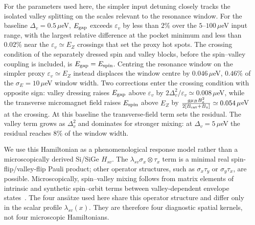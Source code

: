 \documentclass[aip,jap,reprint,superscriptaddress,longbibliography,floatfix]{revtex4-2}
\begin{document}
For the parameters used here, the simpler input detuning closely tracks the
isolated valley splitting on the scales relevant to the resonance window. For
the baseline $\Delta_v=0.5\,\mu$eV, $E_{\rm gap}$ exceeds $\varepsilon_v$ by
less than $2\%$ over the $5$--$100\,\mu$eV input range, with the largest
relative difference at the pocket minimum and less than $0.02\%$ near the
$\varepsilon_v\simeq E_Z$ crossings that set the proxy hot spots. The crossing condition of the separately dressed spin and
valley blocks, before the spin--valley coupling is included, is
$E_{\rm gap}=E_{\rm spin}$. Centring the resonance window on the simpler proxy
$\varepsilon_v\simeq E_Z$ instead displaces the window centre by
$0.046\,\mu$eV, $0.46\%$ of the $\sigma_E=10\,\mu$eV window width. Two
corrections enter the crossing condition with opposite sign: valley dressing
raises $E_{\rm gap}$ above $\varepsilon_v$ by
$2\Delta_v^2/\varepsilon_v\simeq0.008\,\mu$eV, while the transverse
micromagnet field raises $E_{\rm spin}$ above $E_Z$ by
$\frac{g\mu_B B_x^2}{2[B_{\rm ext}+B_z]}\simeq0.054\,\mu$eV at the crossing. At this
baseline the transverse-field term sets the residual. The valley term grows as
$\Delta_v^2$ and dominates for stronger mixing: at $\Delta_v=5\,\mu$eV the
residual reaches $8\%$ of the window width.

We use this Hamiltonian as a phenomenological response model rather than a
microscopically derived Si/SiGe $H_{sv}$. The
$\lambda_{sv}\sigma_x\otimes\tau_x$ term is a minimal real
spin-flip/valley-flip Pauli product; other operator structures, such as
$\sigma_x\tau_y$ or $\sigma_y\tau_x$, are possible. Microscopically,
spin--valley mixing follows from matrix elements of intrinsic and synthetic
spin--orbit terms between valley-dependent envelope
states~\cite{hosseinkhani_theory_2022,huang_spin_2014}. The four ans\"atze used
here share this operator structure and differ only in the scalar profile
$\lambda_{sv}(x)$. They are therefore four diagnostic spatial kernels, not four
microscopic Hamiltonians.
\end{document}
